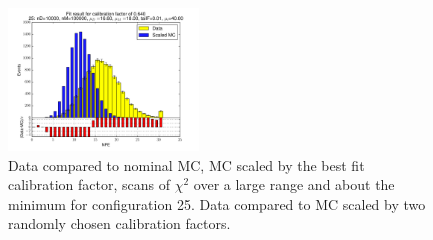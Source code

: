 \begin{figure}[htbp]
\begin{center}
\includegraphics[width=0.45\textwidth]{../FIGURES/25/FIG_Fit_result_for_calibration_factor_of_0_640.pdf} 
\caption{Data compared to nominal MC, MC scaled by the best fit calibration factor, scans of $\chi^2$ over a large range and about the minimum for configuration 25. Data compared to MC scaled by two randomly chosen calibration factors.} 
\label{tab:best_25} 
\end{center} \end{figure} 

